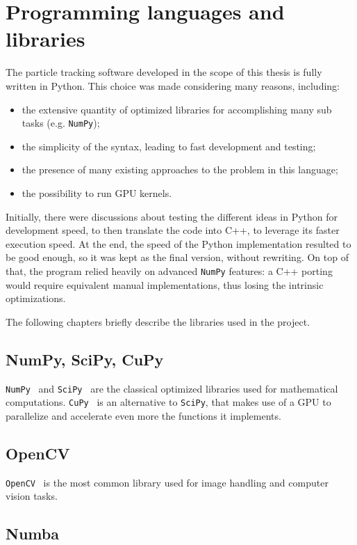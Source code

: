\section{Programming languages and libraries}

The particle tracking software developed in the scope of this thesis is fully written in Python.
This choice was made considering many reasons, including:
\begin{itemize}
	\itemsep 0em
	\item the extensive quantity of optimized libraries for accomplishing many sub tasks (e.g. \texttt{NumPy});
	\item the simplicity of the syntax, leading to fast development and testing;
	\item the presence of many existing approaches to the problem in this language;
	\item the possibility to run GPU kernels.
\end{itemize}
Initially, there were discussions about testing the different ideas in Python for development speed, to then translate the code into C++, to leverage its faster execution speed.
At the end, the speed of the Python implementation resulted to be good enough, so it was kept as the final version, without rewriting.
On top of that, the program relied heavily on advanced \texttt{NumPy} features: a C++ porting would require equivalent manual implementations, thus losing the intrinsic optimizations.

The following chapters briefly describe the libraries used in the project.

\subsection{NumPy, SciPy, CuPy}

\texttt{NumPy}~\cite{numpy} and \texttt{SciPy}~\cite{scipy} are the classical optimized libraries used for mathematical computations.
\texttt{CuPy}~\cite{cupy} is an alternative to \texttt{SciPy}, that makes use of a GPU to parallelize and accelerate even more the functions it implements.

\subsection{OpenCV}

\texttt{OpenCV}~\cite{opencv} is the most common library used for image handling and computer vision tasks.

\subsection{Numba}


